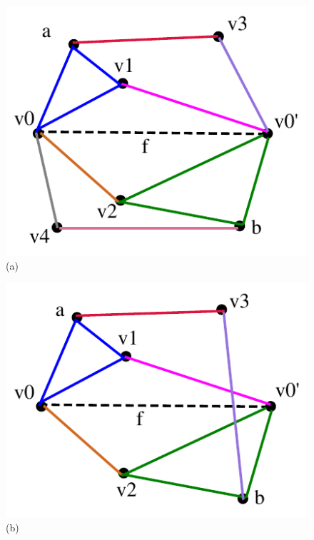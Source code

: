 \documentclass[prodmode,acmtoms]{acmsmall}
\begin{document}
\begin{figure}

 
\centering

\begin{minipage}{.33\linewidth}%
  \centering
  \includegraphics[width=.9\linewidth]{img/low}
  \label{fig:sub1}
  (a)
\end{minipage}%
\begin{minipage}{.33\linewidth}%
  \centering
  \includegraphics[width=.9\linewidth]{img/notlow}
  \label{fig:sub2}
  (b)
\end{minipage}%
\begin{minipage}{.33\linewidth}%

\end{minipage}
\end{figure}
\end{document}
